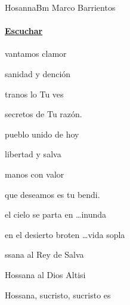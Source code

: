 \documentclass[12pt, spanish]{book}
\begin{document}
    \begin{song}{Hosanna}{Bm}
    {} %
    {Marco Barrientos}
    {} %
    {}
        \ifChordBk
        \paragraph{\mbox{}\hfill\protect\href{https://open.spotify.com/intl-es/track/3EZMEVhLjWN6vEJeWyLw09}{Escuchar}\mbox{}\hfill}
        \fi


        \begin{SBOpGroup}
            vantamos  clamor

             sanidad y dención

            tranos lo  Tu ves

             secretos de Tu razón.
        \end{SBOpGroup}

        \begin{SBOpGroup}
             pueblo unido de hoy

             libertad y salva

            manos con  valor

             que deseamos es tu bendi.

             el cielo se parta en \ldots inunda

            en el desierto broten \ldots vida sopla 
        \end{SBOpGroup}

        \begin{SBChorus}
            ssana al Rey de Salva

            Hossana al Dios Altisi

            Hossana, sucristo, sucristo es 
        \end{SBChorus}


\end{song}
\end{document}
